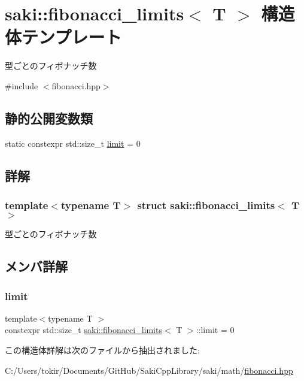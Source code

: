 \hypertarget{structsaki_1_1fibonacci__limits}{}\section{saki\+:\+:fibonacci\+\_\+limits$<$ T $>$ 構造体テンプレート}
\label{structsaki_1_1fibonacci__limits}


型ごとのフィボナッチ数  




{\ttfamily \#include $<$fibonacci.\+hpp$>$}

\subsection*{静的公開変数類}
\begin{DoxyCompactItemize}
\item 
static constexpr std\+::size\+\_\+t \mbox{\hyperlink{structsaki_1_1fibonacci__limits_aa88ddfee93435e380fa146fd996a8c5d}{limit}} = 0
\end{DoxyCompactItemize}


\subsection{詳解}
\subsubsection*{template$<$typename T$>$\newline
struct saki\+::fibonacci\+\_\+limits$<$ T $>$}

型ごとのフィボナッチ数 

\subsection{メンバ詳解}
\mbox{\label{structsaki_1_1fibonacci__limits_aa88ddfee93435e380fa146fd996a8c5d}} 
\subsubsection{\texorpdfstring{limit}{limit}}
{\footnotesize\ttfamily template$<$typename T $>$ \\
constexpr std\+::size\+\_\+t \mbox{\hyperlink{structsaki_1_1fibonacci__limits}{saki\+::fibonacci\+\_\+limits}}$<$ T $>$\+::limit = 0\hspace{0.3cm}{\ttfamily [static]}}



この構造体詳解は次のファイルから抽出されました\+:\begin{DoxyCompactItemize}
\item 
C\+:/\+Users/tokir/\+Documents/\+Git\+Hub/\+Saki\+Cpp\+Library/saki/math/\mbox{\hyperlink{fibonacci_8hpp}{fibonacci.\+hpp}}\end{DoxyCompactItemize}
